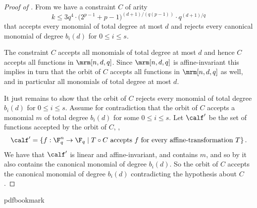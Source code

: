\begin{proof}[Proof of ]
{}From 
we have a constraint $C$ of arity
\[k \leq 3q^4 \cdot \big(2^{p-1}+p-1\big)^{(d+1)/(q(p-1))} \cdot q^{(d+1)/q}\] that
accepts every monomial of total degree at most
$d$ and rejects every canonical monomial of degree $b_i(d)$ for $0 \leq i \leq s$.

%
%
The constraint $C$ accepts all monomials
of total degree at most $d$ and hence $C$ accepts all functions in $\mrm[n,d,q]$.
Since $\mrm[n,d,q]$ is affine-invariant this implies in turn that the orbit of $C$ accepts all functions in $\mrm[n,d,q]$ as well, and in particular all monomials of total degree at most $d$.

It just remains to show that the orbit of $C$ rejects every monomial of total degree $b_i(d)$ for $0 \leq i\leq s$.
Assume for contradiction that the orbit of $C$ accepts a monomial $m$ of total degree $b_i(d)$ for some
$0 \leq i \leq s$.
Let $\calf'$ be the set of functions accepted by the orbit of
$C$, \ie,
$$\calf' = \{f : \F_q^n \to \F_q \;|\;
\mbox{$T \circ C$~accepts~$f$~for~every~affine-transformation~$T\}$}\,.$$
We have that $\calf'$ is linear and affine-invariant, and contains $m$,
and so by  it also contains
the canonical monomial of degree $b_i(d)$. So the orbit of $C$ accepts the canonical monomial of degree $b_i(d)$ contradicting the
hypothesis about $C$.

%
%
\end{proof}

%
%
%
%
%
\providecommand{\bibhead}[1]{}
%
\expandafter\ifx\csname pdfbookmark\endcsname\relax%
  \providecommand{\tocrefpdfbookmark}{}
\else\providecommand{\tocrefpdfbookmark}{%
   \hypertarget{tocreferences}{}%
   \pdfbookmark[1]{References}{tocreferences}}%
\fi


